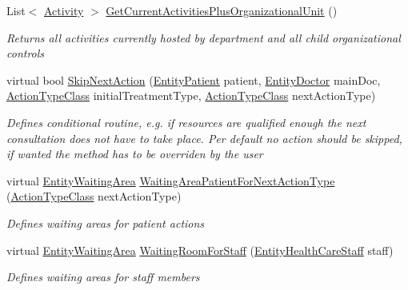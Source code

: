 \begin{DoxyCompactItemize}
List$<$ \hyperlink{class_simulation_core_1_1_h_c_c_m_elements_1_1_activity}{Activity} $>$ \hyperlink{class_general_health_care_elements_1_1_control_units_1_1_control_unit_health_care_department_a9aede33cac247d8b1ee3602a1705c2bc}{Get\+Current\+Activities\+Plus\+Organizational\+Unit} ()
\begin{DoxyCompactList}\small\item\em Returns all activities currently hosted by department and all child organizational controls \end{DoxyCompactList}\item 
virtual bool \hyperlink{class_general_health_care_elements_1_1_control_units_1_1_control_unit_health_care_department_a12e9fd14d3b5316ba3f1b7b9a98ef6e5}{Skip\+Next\+Action} (\hyperlink{class_general_health_care_elements_1_1_entities_1_1_entity_patient}{Entity\+Patient} patient, \hyperlink{class_general_health_care_elements_1_1_entities_1_1_entity_doctor}{Entity\+Doctor} main\+Doc, \hyperlink{class_general_health_care_elements_1_1_general_classes_1_1_action_types_and_paths_1_1_action_type_class}{Action\+Type\+Class} initial\+Treatment\+Type, \hyperlink{class_general_health_care_elements_1_1_general_classes_1_1_action_types_and_paths_1_1_action_type_class}{Action\+Type\+Class} next\+Action\+Type)
\begin{DoxyCompactList}\small\item\em Defines conditional routine, e.\+g. if resources are qualified enough the next consultation does not have to take place. Per default no action should be skipped, if wanted the method has to be overriden by the user \end{DoxyCompactList}\item 
virtual \hyperlink{class_general_health_care_elements_1_1_entities_1_1_entity_waiting_area}{Entity\+Waiting\+Area} \hyperlink{class_general_health_care_elements_1_1_control_units_1_1_control_unit_health_care_department_ab18eadf9b824fe70544bd58f6126b1f8}{Waiting\+Area\+Patient\+For\+Next\+Action\+Type} (\hyperlink{class_general_health_care_elements_1_1_general_classes_1_1_action_types_and_paths_1_1_action_type_class}{Action\+Type\+Class} next\+Action\+Type)
\begin{DoxyCompactList}\small\item\em Defines waiting areas for patient actions \end{DoxyCompactList}\item 
virtual \hyperlink{class_general_health_care_elements_1_1_entities_1_1_entity_waiting_area}{Entity\+Waiting\+Area} \hyperlink{class_general_health_care_elements_1_1_control_units_1_1_control_unit_health_care_department_a33d63add17f48d032122f61493a79f14}{Waiting\+Room\+For\+Staff} (\hyperlink{class_general_health_care_elements_1_1_entities_1_1_entity_health_care_staff}{Entity\+Health\+Care\+Staff} staff)
\begin{DoxyCompactList}\small\item\em Defines waiting areas for staff members \end{DoxyCompactList}\end{DoxyCompactItemize}
